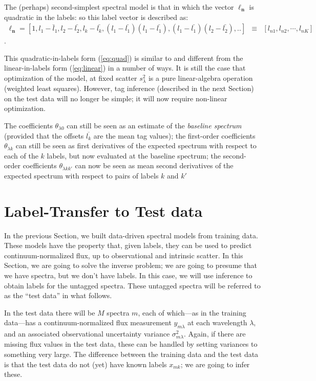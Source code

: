 \documentclass[12pt, preprint]{aastex}
\newcommand{\sectionname}{Section}
\newcommand{\set}[1]{\bm{#1}}
\newcommand{\mean}[1]{\overline{#1}}
\begin{document}
The (perhaps) second-simplest spectral model is that in which the
vector $\set{\ell_n}$ is quadratic in the labels: so this label vector is described as:
\begin{eqnarray}
\set{\ell_n} =  [1, l_1 - \bar{l}_1, l_2 - \bar{l_2}, l_k - \bar{l_k}, (l_1 - \bar{l_1})(l_1 - \bar{l_1}), (l_1 - \bar{l_1})(l_2 - \bar{l_2}), .. ] &\equiv& [l_{n1}, l_{n2}, \cdots, l_{nK}] 
\label{eq:quad}
\end{eqnarray}.

This quadratic-in-labels form (\ref{eq:quad}) is similar to and
different from the linear-in-labels form (\ref{eq:linear}) in a number
of ways.
It is still the case that optimization of the model, at fixed scatter
$s_\lambda^2$ is a pure linear-algebra operation (weighted least
squares).
However, tag inference (described in the next Section) on the test
data will no longer be simple; it will now require non-linear
optimization.

The coefficients $\theta_{\lambda 0}$ can still be seen as an estimate of the
\emph{baseline spectrum} (provided that the offsets $\mean{l_k}$ are the
mean tag values); the first-order coefficients $\theta_{\lambda k}$ can still
be seen as first derivatives of the expected spectrum with respect to
each of the $k$ labels, but now evaluated at the baseline spectrum; the
second-order coefficients $\theta_{\lambda kk'}$ can now be seen as mean
second derivatives of the expected spectrum with respect to pairs of
labels $k$ and $k'$



\section{Label-Transfer to Test data}
\label{sec:paramestimate}

In the previous \sectionname, we built data-driven spectral models
from training data.
These models have the property that, given labels, they can be used to
predict continuum-normalized flux, up to observational and intrinsic
scatter.
In this \sectionname, we are going to solve the inverse problem; we
are going to presume that we have spectra, but we don't have labels.
In this case, we will use inference to obtain labels for the untagged
spectra.
These untagged spectra will be referred to as the ``test data'' in
what follows.

In the test data there will be $M$ spectra $m$, each of which---as in
the training data---has a continuum-normalized flux measurement
$y_{m\lambda}$ at each wavelength $\lambda$, and an
associated observational uncertainty variance $\sigma_{m\lambda}^2$.
Again, if there are missing flux values in the test data, these can be
handled by setting variances to something very large.
The difference between the training data and the test data is that the
test data do not (yet) have known labels $x_{mk}$; we are going to infer
these.
\end{document}
